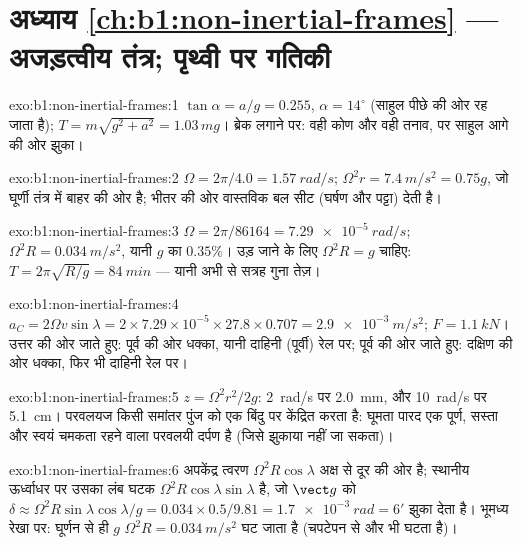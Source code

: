 \section*{अध्याय \ref{ch:b1:non-inertial-frames} --- अजड़त्वीय तंत्र; पृथ्वी पर गतिकी}

\begin{solution}{exo:b1:non-inertial-frames:1}
$\tan\alpha = a/g = 0.255$, $\alpha = 14^\circ$ (साहुल पीछे की ओर रह जाता है);
$T = m\sqrt{g^2 + a^2} = 1.03\,mg$। ब्रेक लगाने पर: वही कोण और वही तनाव,
पर साहुल आगे की ओर झुका।
\end{solution}

\begin{solution}{exo:b1:non-inertial-frames:2}
$\Omega = 2\pi/4.0 = \qty{1.57}{rad/s}$; $\Omega^2r = \qty{7.4}{m/s^2} = 0.75g$,
जो घूर्णी तंत्र में बाहर की ओर है; भीतर की ओर वास्तविक बल सीट (घर्षण और
पट्टा) देती है।
\end{solution}

\begin{solution}{exo:b1:non-inertial-frames:3}
$\Omega = 2\pi/86164 = \qty{7.29e-5}{rad/s}$; $\Omega^2R = \qty{0.034}{m/s^2}$,
यानी $g$ का $0.35\%$। उड़ जाने के लिए $\Omega^2R = g$ चाहिए: $T = 2\pi\sqrt{R/g} =
\qty{84}{min}$ --- यानी अभी से सत्रह गुना तेज़।
\end{solution}

\begin{solution}{exo:b1:non-inertial-frames:4}
$a_C = 2\Omega v\sin\lambda = 2 \times 7.29\times10^{-5} \times 27.8 \times 0.707
= \qty{2.9e-3}{m/s^2}$; $F = \qty{1.1}{kN}$। उत्तर की ओर जाते हुए: पूर्व की
ओर धक्का, यानी दाहिनी (पूर्वी) रेल पर; पूर्व की ओर जाते हुए: दक्षिण की ओर
धक्का, फिर भी दाहिनी रेल पर।
\end{solution}

\begin{solution}{exo:b1:non-inertial-frames:5}
$z = \Omega^2r^2/2g$: \qty{2}{rad/s} पर \qty{2.0}{mm}, और
\qty{10}{rad/s} पर \qty{5.1}{cm}। परवलयज किसी समांतर पुंज को एक बिंदु पर
केंद्रित करता है: घूमता पारद एक पूर्ण, सस्ता और स्वयं चमकता रहने वाला
परवलयी दर्पण है (जिसे झुकाया नहीं जा सकता)।
\end{solution}

\begin{solution}{exo:b1:non-inertial-frames:6}
अपकेंद्र त्वरण $\Omega^2R\cos\lambda$ अक्ष से दूर की ओर है; स्थानीय
ऊर्ध्वाधर पर उसका लंब घटक $\Omega^2R\cos\lambda
\sin\lambda$ है, जो $\vect g$ को $\delta \approx \Omega^2R\sin\lambda\cos\lambda/g
= 0.034 \times 0.5/9.81 = \qty{1.7e-3}{rad} = 6'$ झुका देता है। भूमध्य रेखा पर: घूर्णन से ही $g$
$\Omega^2R = \qty{0.034}{m/s^2}$ घट जाता है (चपटेपन से और भी घटता है)।
\end{solution}

